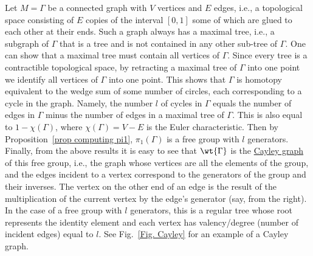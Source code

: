 \begin{example}
    Let $M=\Gamma$ be a connected graph with $V$ vertices and $E$ edges, i.e., a topological space consisting of $E$ copies of the interval $[0,1]$ some of which are glued to each other at their ends. Such a graph always has a maximal tree, i.e., a subgraph of $\Gamma$ that is a tree and is not contained in any other sub-tree of $\Gamma$. One can show that a maximal tree must contain all vertices of $\Gamma$. Since every tree is a contractible topological space, by retracting a maximal tree of $\Gamma$ into one point we identify all vertices of $\Gamma$ into one point. This shows that $\Gamma$ is homotopy equivalent to the wedge sum of some number of circles, each corresponding to a cycle in the graph. Namely, the number $l$ of cycles in $\Gamma$ equals the number of edges in $\Gamma$ minus the number of edges in a maximal tree of $\Gamma$. This is also equal to $1-\chi(\Gamma)$, where $\chi(\Gamma)=V-E$ is the Euler characteristic. Then by Proposition~\ref{prop computing pi1}, $\pi_1(\Gamma)$  is a free group with $l$ generators. Finally, from the above results it is easy to see that $\wt{\Gamma}$ is the \href{https://en.wikipedia.org/wiki/Cayley_graph}{Cayley graph} of this free group, i.e., the graph whose vertices are all the elements of the group, and the edges incident to a vertex correspond to the generators of the group and their inverses. The vertex on the other end of an edge is the result of the multiplication of the current vertex by the edge's generator (say, from the right). In the case of a free group with $l$ generators, this is a regular tree whose root represents the identity element and each vertex has valency/degree (number of incident edges) equal to $l$. See Fig.~\ref{Fig. Cayley} for an example of a Cayley graph.
\end{example}
